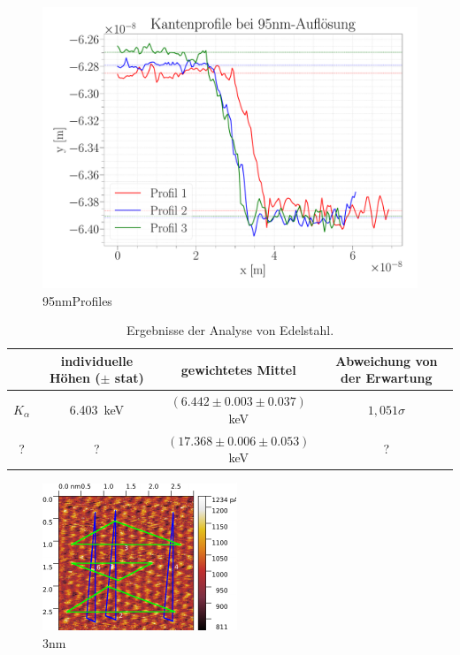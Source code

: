 \begin{figure}[H]
\centering
\includegraphics[width=\textwidth]{../Figures/95nm_profiles.pdf}
\caption{95nmProfiles}
\label{95nmProfiles}
\end{figure}

\begin{table}[H]
	\renewcommand{\arraystretch}{1.5}
	\centering
	\begin{tabular}{|c|c|c|c|}
		\hline
		 & individuelle Höhen ($\pm$ stat) & gewichtetes Mittel & Abweichung von der Erwartung \\
		\hline
		$K_\alpha$ & \SI{6.403}{keV} & $(6.442 \pm 0.003 \pm 0.037)$keV & $1,051\sigma$ \\
		\cline{1-4}
		 ? & ? & $(17.368 \pm 0.006 \pm 0.053)$keV & ? \\
		\hline
	\end{tabular}
	\caption{Ergebnisse der Analyse von Edelstahl.}
	\label{tab:heights}
\end{table}

\begin{figure}[H]
\centering
\includegraphics[width=\textwidth]{../Gwyddion/HOPG/3nm_gimped.pdf}
\caption{3nm}
\label{3nm}
\end{figure}

